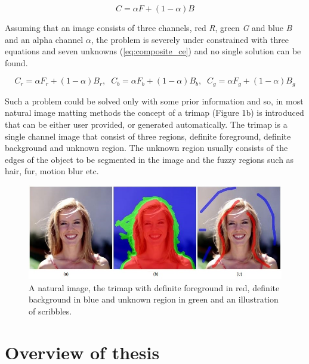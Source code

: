 \begin{equation} \label{eq:composite_e}
C=\alpha F+(1-\alpha)B
\end{equation}

Assuming that an image consists of three channels, red \textit{R}, green \textit{G} and blue \textit{B} and an alpha channel $\alpha$, the problem is severely under constrained with three equations and seven unknowns (\ref{eq:composite_ce}) and no single solution can be found. 

\begin{equation} \label{eq:composite_ce}
C_r=\alpha F_r+(1-\alpha)B_r,\;\; C_b=\alpha F_b+(1-\alpha)B_b,\;\; C_g=\alpha F_g+(1-\alpha)B_g
\end{equation}

Such a problem could be solved only with some prior information and so, in most natural image matting methods the concept of a trimap (Figure 1b) is introduced that can be either user provided, or generated automatically. The trimap is a single channel image that consist of three regions, definite foreground, definite background and unknown region. The unknown region usually consists of the edges of the object to be segmented in the image and the fuzzy regions such as hair, fur, motion blur etc.

\begin{figure}[t!]
\centering
\includegraphics[width=0.9\columnwidth]{Chapter1/1/trimap.jpg}
\caption[Natural image, trimap and scribbles.]{A natural image, the trimap with definite foreground in red, definite background in blue and unknown region in green and an illustration of scribbles.}
\label{fig:trimap}
\end{figure}

\section{Overview of thesis}
\label{sec:overview-of-thesis}

